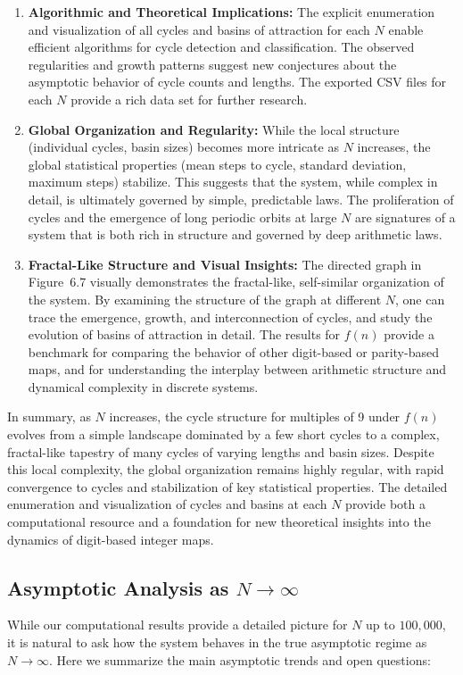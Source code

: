 \documentclass[12pt]{article}
\begin{document}
\begin{enumerate}
    \item \textbf{Algorithmic and Theoretical Implications:} The explicit enumeration and visualization of all cycles and basins of attraction for each $N$ enable efficient algorithms for cycle detection and classification. The observed regularities and growth patterns suggest new conjectures about the asymptotic behavior of cycle counts and lengths. The exported CSV files for each $N$ provide a rich data set for further research.
    \item \textbf{Global Organization and Regularity:} While the local structure (individual cycles, basin sizes) becomes more intricate as $N$ increases, the global statistical properties (mean steps to cycle, standard deviation, maximum steps) stabilize. This suggests that the system, while complex in detail, is ultimately governed by simple, predictable laws. The proliferation of cycles and the emergence of long periodic orbits at large $N$ are signatures of a system that is both rich in structure and governed by deep arithmetic laws.
    \item \textbf{Fractal-Like Structure and Visual Insights:} The directed graph in Figure~6.7 visually demonstrates the fractal-like, self-similar organization of the system. By examining the structure of the graph at different $N$, one can trace the emergence, growth, and interconnection of cycles, and study the evolution of basins of attraction in detail. The results for $f(n)$ provide a benchmark for comparing the behavior of other digit-based or parity-based maps, and for understanding the interplay between arithmetic structure and dynamical complexity in discrete systems.
\end{enumerate}

In summary, as $N$ increases, the cycle structure for multiples of 9 under $f(n)$ evolves from a simple landscape dominated by a few short cycles to a complex, fractal-like tapestry of many cycles of varying lengths and basin sizes. Despite this local complexity, the global organization remains highly regular, with rapid convergence to cycles and stabilization of key statistical properties. The detailed enumeration and visualization of cycles and basins at each $N$ provide both a computational resource and a foundation for new theoretical insights into the dynamics of digit-based integer maps.

\subsection*{Asymptotic Analysis as $N \to \infty$}
While our computational results provide a detailed picture for $N$ up to $100,000$, it is natural to ask how the system behaves in the true asymptotic regime as $N \to \infty$. Here we summarize the main asymptotic trends and open questions:
\end{document}
